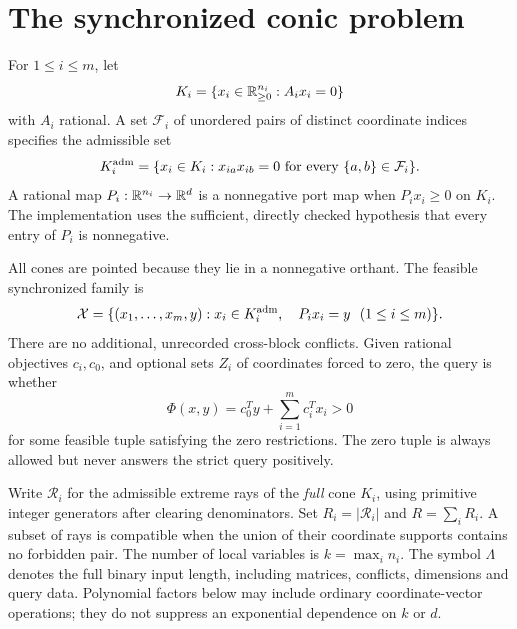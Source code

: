 \section{The synchronized conic problem}
\label{sec:model}

\begin{definition}
For $1\le i\le m$, let
\[
 K_i=\{x_i\in\mathbb R^{n_i}_{\ge0}:A_i x_i=0\}
\]
with $A_i$ rational. A set $\mathcal F_i$ of unordered pairs of distinct coordinate indices specifies the admissible set
\[
 K_i^{\rm adm}=\{x_i\in K_i:x_{ia}x_{ib}=0\text{ for every }\{a,b\}\in\mathcal F_i\}.
\]
A rational map $P_i:\mathbb R^{n_i}\to\mathbb R^d$ is a nonnegative port map when $P_i x_i\ge0$ on $K_i$. The implementation uses the sufficient, directly checked hypothesis that every entry of $P_i$ is nonnegative.
\end{definition}

All cones are pointed because they lie in a nonnegative orthant. The feasible synchronized family is
\begin{equation}
 \mathcal X=\{(x_1,\ldots,x_m,y):x_i\in K_i^{\rm adm},\quad P_i x_i=y\ \ (1\le i\le m)\}.
 \label{eq:model}
\end{equation}
There are no additional, unrecorded cross-block conflicts. Given rational objectives $c_i,c_0$, and optional sets $Z_i$ of coordinates forced to zero, the query is whether
\begin{equation}
 \Phi(x,y)=c_0^Ty+\sum_{i=1}^m c_i^Tx_i>0
 \label{eq:objective}
\end{equation}
for some feasible tuple satisfying the zero restrictions. The zero tuple is always allowed but never answers the strict query positively.

Write $\mathcal R_i$ for the admissible extreme rays of the \emph{full} cone $K_i$, using primitive integer generators after clearing denominators. Set $R_i=|\mathcal R_i|$ and $R=\sum_iR_i$. A subset of rays is compatible when the union of their coordinate supports contains no forbidden pair. The number of local variables is $k=\max_i n_i$. The symbol $\Lambda$ denotes the full binary input length, including matrices, conflicts, dimensions and query data. Polynomial factors below may include ordinary coordinate-vector operations; they do not suppress an exponential dependence on $k$ or $d$.

